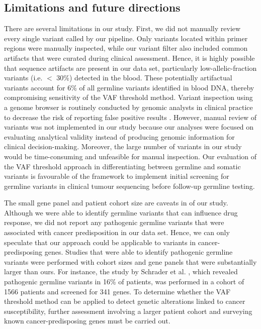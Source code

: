 \subsection{Limitations and future directions}

There are several limitations in our study. First, we did not manually review every single variant called by our pipeline. Only variants located within primer regions were manually inspected, while our variant filter also included common artifacts that were curated during clinical assessment. Hence, it is highly possible that sequence artifacts are present in our data set, particularly low-allelic-fraction variants (i.e. $<$ 30\%) detected in the blood. These potentially artifactual variants account for 6\% of all germline variants identified in blood DNA, thereby compromising sensitivity of the VAF threshold method. Variant inspection using a genome browser is routinely conducted by genomic analysts in clinical practice to decrease the risk of reporting false positive results \cite{Strom2016, Garofalo2016}. However, manual review of variants was not implemented in our study because our analyses were focused on evaluating analytical validity instead of producing genomic information for clinical decision-making. Moreover, the large number of variants in our study would be time-consuming and unfeasible for manual inspection. Our evaluation of the VAF threshold approach in differentiating between germline and somatic variants is favourable of the framework to implement initial screening for germline variants in clinical tumour sequencing before follow-up germline testing.

The small gene panel and patient cohort size are caveats in of our study. Although we were able to identify germline variants that can influence drug response, we did not report any pathogenic germline variants that were associated with cancer predisposition in our data set. Hence, we can only speculate that our approach could be applicable to variants in cancer-predisposing genes. Studies that were able to identify pathogenic germline variants were performed with cohort sizes and gene panels that were substantially larger than ours. For instance, the study by Schrader et al. \cite{Schrader2015}, which revealed pathogenic germline variants in 16\% of patients, was performed in a cohort of 1566 patients and screened for 341 genes. To determine whether the VAF threshold method can be applied to detect genetic alterations linked to cancer susceptibility, further assessment involving a larger patient cohort and surveying known cancer-predisposing genes must be carried out.

